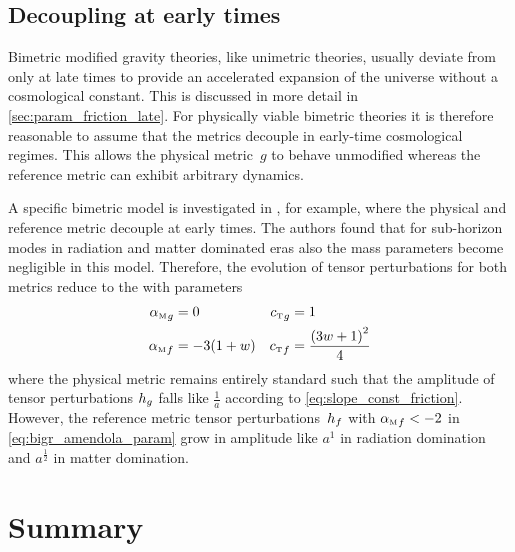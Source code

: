 \documentclass[12pt,parskip=half]{scrreprt}
\begin{document}


\section{Decoupling at early times}

Bimetric modified gravity theories, like unimetric theories, usually deviate from \LCDM only at late times to provide an accelerated expansion of the universe without a cosmological constant. This is discussed in more detail in \autoref{sec:param_friction_late}. For physically viable bimetric theories it is therefore reasonable to assume that the metrics decouple in early-time cosmological regimes. This allows the physical metric~\(g\) to behave unmodified whereas the reference metric can exhibit arbitrary dynamics.

A specific bimetric model is investigated in \cite{Amendola2015}, for example, where the physical and reference metric decouple at early times. The authors found that for sub-horizon modes in radiation and matter dominated eras also the mass parameters become negligible in this model. Therefore, the evolution of tensor perturbations for both metrics reduce to the  with parameters \autocite{Amendola2015}
\begin{subequations}
\begin{align}
	\alphaMofmetr{g} &= 0 & \cTofmetr{g} &= 1 \\
	\alphaMofmetr{f} &= -3(1+\eosp) & \cTofmetr{f} &= \frac{\del{3\eosp + 1}^2}{4} \label{eq:bigr_amendola_param}
\end{align}
\end{subequations}
where the physical metric remains entirely standard such that the amplitude of tensor perturbations \(h_{g}\) falls like \(\frac{1}{a}\) according to \eqref{eq:slope_const_friction}. However, the reference metric tensor perturbations~\(h_{f}\) with \({\alpha_{\textnormal{\tiny{M}}}}_{f}<-2\) in \eqref{eq:bigr_amendola_param} grow in amplitude like \(a^1\) in radiation domination and \(a^\frac{1}{2}\) in matter domination.



\chapter{Summary}\label{ch:summary}
\end{document}
